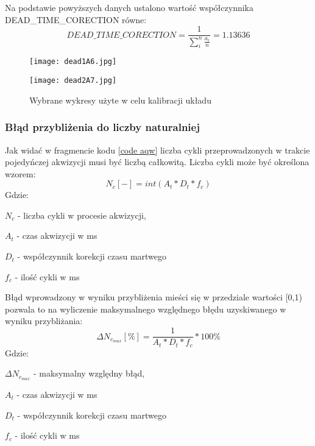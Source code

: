 Na podstawie powyższych danych ustalono wartość współczynnika DEAD\_TIME\_CORECTION równe:
\begin{equation}
        \label{dead time eq}
        DEAD\_TIME\_CORECTION = \frac{1}{\sum^n_i \frac{a_i}{n}} = 1.13636
\end{equation} 

\begin{figure}
        \centering
        \begin{multicols}{2}
                \texttt{[image: dead1A6.jpg]} \par
                \texttt{[image: dead2A7.jpg]} \par
        \end{multicols}
        \caption{Wybrane wykresy użyte w celu kalibracji układu}
        \label{wykresy fit calib}
\end{figure}

\subsubsection{Błąd przybliżenia do liczby naturalniej}
Jak widać w fragmencie kodu \ref{code aqw} liczba cykli przeprowadzonych w trakcie pojedyńczej akwizycji musi być liczbą całkowitą. Liczba cykli może być określona wzorem:
\begin{equation}
        N_c [-] = int(A_t*D_t*f_c)
\end{equation}
Gdzie:
\begin{description}
        \item $N_c$ - liczba cykli w procesie akwizycji,
        \item $A_t$ - czas  akwizycji w ms
        \item $D_t$ - współczynnik korekcji czasu martwego 
        \item $f_c$ - ilość cykli w ms
\end{description}

Błąd wprowadzony w wyniku przybliżenia mieści się w przedziale wartości [0,1) pozwala to na wyliczenie maksymalnego względnego błędu uzyskiwanego w wyniku przybliżania:
\begin{equation}
        \Delta N_{c_{max}} [\%] = \frac{1}{A_t*D_t*f_c}  * 100\%
\end{equation} 
Gdzie:
\begin{description}
        \item $\Delta N_{c_{max}}$ - maksymalny względny błąd,
        \item $A_t$ - czas  akwizycji w ms
        \item $D_t$ - współczynnik korekcji czasu martwego 
        \item $f_c$ - ilość cykli w ms
\end{description}

